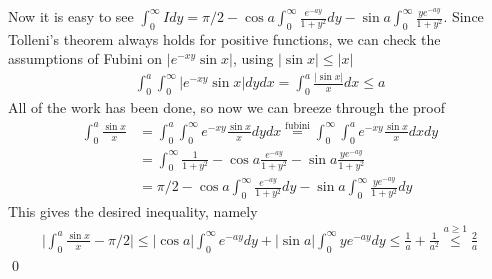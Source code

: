 \documentclass[10.5pt]{article}
\theoremstyle{definition}
\newcommand{\abs}[1]{\lvert#1\rvert}
\begin{document}
    Now it is easy to see \(\int_0^\infty Idy = \pi/2 - \cos a \int_0^\infty \frac{e^{-ay}}{1 + y^2}dy - \sin a \int_0^\infty \frac{ye^{-ay}}{1+y^2}\). Since Tolleni's theorem always holds for positive functions, we can check the assumptions of Fubini on \(\abs{e^{-xy}\sin x}\), using \(\abs{\sin x} \leq \abs{x}\)
    \begin{align*}
        \int_0^a \int_0^\infty \abs{e^{-xy}\sin x}dydx = \int_0^a \frac{\abs{\sin x}}{x}dx \leq a
    \end{align*}
    All of the work has been done, so now we can breeze through the proof
    \begin{align*}
        \int_0^a \frac{\sin x}{x} &= \int_0^a \int_0^\infty e^{-xy}\frac{\sin x}{x} dydx \overset{\text{fubini}}{=} \int_0^\infty\int_0^a e^{-xy}\frac{\sin x}{x} dxdy \\
        &= \int_0^\infty \frac{1}{1 + y^2} - \cos a \frac{e^{-ay}}{1 + y^2} - \sin a \frac{ye^{-ay}}{1+y^2} \\ &= \pi/2 - \cos a \int_0^\infty\frac{e^{-ay}}{1 + y^2}dy - \sin a \int_0^\infty \frac{ye^{-ay}}{1+y^2}dy
    \end{align*}
    This gives the desired inequality, namely
    \begin{align*}
        \abs{\int_0^a \frac{\sin x}{x} - \pi/2} \leq \abs{\cos a}\int_0^\infty e^{-ay}dy + \abs{\sin a} \int_0^\infty  ye^{-ay}dy \leq \frac{1}{a} + \frac{1}{a^2} \overset{a \geq 1}{\leq} \frac{2}{a}
    \end{align*} \qed
\end{document}
